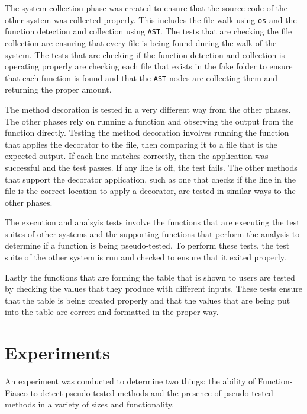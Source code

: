 The system collection phase was created to ensure that the source code of the other system was collected properly. This includes the file walk using \texttt{os} and the function detection and collection using \texttt{AST}. The tests that are checking the file collection are ensuring that every file is being found during the walk of the system. The tests that are checking if the function detection and collection is operating properly are checking each file that exists in the fake folder to ensure that each function is found and that the \texttt{AST} nodes are collecting them and returning the proper amount.

The method decoration is tested in a very different way from the other phases. The other phases rely on running a function and observing the output from the function directly. Testing the method decoration involves running the function that applies the decorator to the file, then comparing it to a file that is the expected output. If each line matches correctly, then the application was successful and the test passes. If any line is off, the test fails. The other methods that support the decorator application, such as one that checks if the line in the file is the correct location to apply a decorator, are tested in similar ways to the other phases.

The execution and analsyis tests involve the functions that are executing the test suites of other systems and the supporting functions that perform the analysis to determine if a function is being pseudo-tested. To perform these tests, the test suite of the other system is run and checked to ensure that it exited properly.

Lastly the functions that are forming the table that is shown to users are tested by checking the values that they produce with different inputs. These tests ensure that the table is being created properly and that the values that are being put into the table are correct and formatted in the proper way.


\section{Experiments} \label{sec:Experiments}
An experiment was conducted to determine two things: the ability of Function-Fiasco to detect pseudo-tested methods and the presence of pseudo-tested methods in a variety of sizes and functionality.

